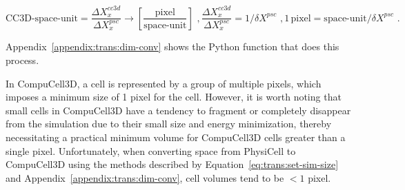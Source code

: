 
\begin{subequations}\label{eq:trans:px-space-unit}
    \begin{equation}\label{eq:trans:px-space-unit:!}
        \text{CC3D-space-unit} = \frac{\Delta X^{cc3d}_x}{\Delta X^{psc}_x} \rightarrow \left[\frac{\text{pixel}}{\text{space-unit}}\right]\,\,,
    \end{equation}
    \begin{equation}\label{eq:trans:px-space-unit:2}
        \frac{\Delta X^{cc3d}_x}{\Delta X^{psc}_x} = 1/\delta X^{psc}\,\,,
    \end{equation}
    \begin{equation}\label{eq:trans:px-space-unit:3}
        1\,\text{pixel} = \text{space-unit}/\delta X^{psc}\,\,.
    \end{equation}
\end{subequations}

\noindent Appendix~\ref{appendix:trans:dim-conv} shows the Python function that does this process.


In CompuCell3D, a cell is represented by a group of multiple pixels, which imposes a minimum size of 1 pixel for the cell. However, it is worth noting that small cells in CompuCell3D have a tendency to fragment or completely disappear from the simulation due to their small size and energy minimization, thereby necessitating a practical minimum volume for CompuCell3D cells greater than a single pixel. Unfortunately, when converting space from PhysiCell to CompuCell3D using the methods described by Equation~\ref{eq:trans:set-sim-size} and Appendix~\ref{appendix:trans:dim-conv}, cell volumes tend to be $<1$ pixel.

